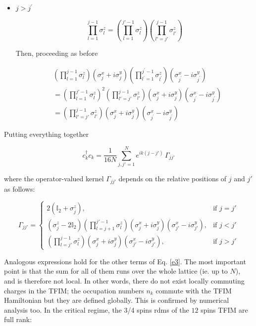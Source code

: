 \documentclass{article}
\begin{document}
\begin{itemize}
\item $j > j^\prime$

\begin{equation}
\prod_{l=1}^{j-1} \sigma_l^z =
\left( \prod_{l=1}^{j'-1} \sigma_l^z \right)
\left( \prod_{l'=j'}^{j-1} \sigma_{l'}^z \right)
\end{equation}

Then, proceeding as before

\begin{align}
 &\left( \prod_{l=1}^{j-1} \sigma_l^z \right) \left( \sigma_j^x + i \sigma_j^y\right) \left( \prod_{l^\prime=1}^{j^\prime-1} \sigma_{l^\prime}^z \right) \left( \sigma_{j^\prime}^x - i \sigma_{j^\prime}^y\right) \\ 
 &= \left( \prod_{l=1}^{j'-1} \sigma_l^z \right)^2 \left( \prod_{l'=j'}^{j-1} \sigma_{l'}^z \right) \left( \sigma_j^x + i \sigma_j^y \right) \left( \sigma_{j^\prime}^x - i \sigma_{j^\prime}^y \right) \\
 &= \left( \prod_{l'=j'}^{j-1} \sigma_{l'}^z \right) \left( \sigma_j^x + i \sigma_j^y \right) \left( \sigma_{j^\prime}^x - i \sigma_{j^\prime}^y \right)
 \end{align} 

\end{itemize}

Putting everything together

\begin{equation}
c_k^\dagger c_k = \frac{1}{16N} \sum_{j,j'=1}^N e^{ik(j - j')} \, \Gamma_{jj'}
\end{equation}

where the operator-valued kernel \( \Gamma_{jj'} \) depends on the relative positions of \( j \) and \( j' \) as follows:

\begin{equation}
\Gamma_{jj'} =
\begin{cases}
2(\mathbb{I}_2 + \sigma_j^z), & \text{if } j = j' \\[1.2em]
(\sigma_j^z - 2 \mathbb{I}_2)
\left( \prod\limits_{l = j+1}^{j'-1} \sigma_l^z \right)
(\sigma_j^x + i \sigma_j^y)(\sigma_{j'}^x - i \sigma_{j'}^y),
& \text{if } j < j' \\[1.2em]
\left( \prod\limits_{l = j'}^{j-1} \sigma_l^z \right)
(\sigma_j^x + i \sigma_j^y)(\sigma_{j'}^x - i \sigma_{j'}^y),
& \text{if } j > j'
\end{cases}
\end{equation}

Analogous expressions hold for the other terms of Eq. \eqref{e3}. The most important point is that the sum for all of them runs over the whole lattice (ie. up to $N$), and is therefore not local. In other words, there do not exist locally commuting charges in the TFIM; the occupation numbers $n_k$ commute with the TFIM Hamiltonian but they are defined globally. This is confirmed by numerical analysis too. In the critical regime, the 3/4 spins rdms of the $12$ spins TFIM are full rank:
\end{document}
